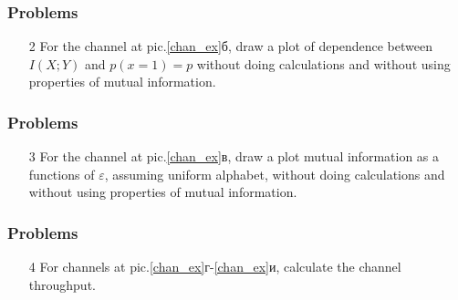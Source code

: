 \documentclass[14pt]{beamer}
\begin{document}
\begin{frame}
\frametitle{Problems}
\begin{enumerate}    
    
    \item[2]
    For the channel at pic.\ref{chan_ex}б, draw a plot of dependence between $I\left( {X;Y} \right)$ and  $p\left( {x = 1}
    \right) = p$ without doing calculations and without using properties of mutual information.
 
\end{enumerate}
\end{frame}    
    
\begin{frame}
\frametitle{Problems}
\begin{enumerate} 
    
    \item[3]
    For the channel at pic.\ref{chan_ex}в, draw a plot mutual information as a functions of $\varepsilon $, assuming uniform alphabet, without doing calculations and without using properties of mutual information.

\end{enumerate}
\end{frame}    
    
\begin{frame}
\frametitle{Problems}
\begin{enumerate}
    
    \item[4]
    For channels at pic.\ref{chan_ex}г-\ref{chan_ex}и, calculate the channel throughput.

\end{enumerate}
\end{frame}
\end{document}
